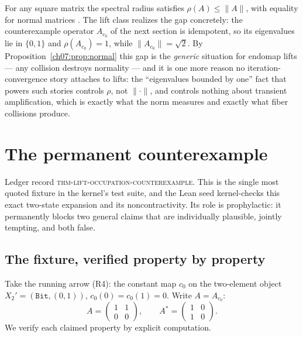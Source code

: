 \begin{remark}\label{ch07:rem:spectralradius}
For any square matrix the spectral radius satisfies
$\rho(A)\le\lVert A\rVert$, with equality for normal matrices \cite{horn}.
The lift class realizes the gap concretely: the counterexample operator
$A_{c_0}$ of the next section is idempotent, so its eigenvalues lie in
$\{0,1\}$ and $\rho(A_{c_0})=1$, while
$\lVert A_{c_0}\rVert=\sqrt2$. By
Proposition~\ref{ch07:prop:normal} this gap is the \emph{generic} situation
for endomap lifts --- any collision destroys normality --- and it is one
more reason no iteration-convergence story attaches to lifts: the
``eigenvalues bounded by one'' fact that powers such stories controls
$\rho$, not $\lVert\cdot\rVert$, and controls nothing about transient
amplification, which is exactly what the norm measures and exactly what
fiber collisions produce.
\end{remark}

\section{The permanent counterexample}\label{ch07:sec:counterexample}

Ledger record \textsc{thm-lift-occupation-counterexample}. This is the single
most quoted fixture in the kernel's test suite, and the Lean seed
kernel-checks this exact two-state expansion and its noncontractivity. Its
role is prophylactic: it permanently blocks two general claims that are
individually plausible, jointly tempting, and both false.

\subsection{The fixture, verified property by property}

Take the running arrow (R4): the constant map $c_0$ on the two-element
object $X_2'=(\texttt{Bit},(0,1))$, $c_0(0)=c_0(1)=0$. Write $A=A_{c_0}$:
\[
A=\begin{pmatrix}1&1\\0&0\end{pmatrix},
\qquad
A^{*}=\begin{pmatrix}1&0\\1&0\end{pmatrix}.
\]
We verify each claimed property by explicit computation.

